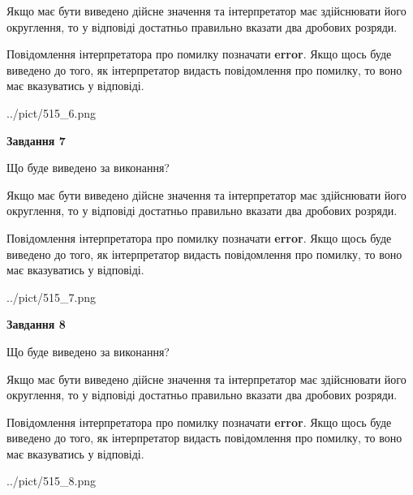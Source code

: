 \documentclass[12pt, ukrainian]{article}
\begin{document}
{\begin {Large}
Якщо має бути виведено дійсне значення та інтерпретатор має здійснювати його округлення, 
то у відповіді достатньо правильно вказати два дробових розряди.

Повідомлення інтерпретатора про помилку позначати \textbf{error}.
Якщо щось буде виведено до того, як інтерпретатор видасть повідомлення про помилку, 
то воно має вказуватись у відповіді. \par

\begin{center}
	{../pict/515_6.png}
\end{center}
\newpage

{\begin {center}\textbf{Завдання 7}\end {center}}\par
Що буде виведено за виконання? \par

Якщо має бути виведено дійсне значення та інтерпретатор має здійснювати його округлення, 
то у відповіді достатньо правильно вказати два дробових розряди.

Повідомлення інтерпретатора про помилку позначати \textbf{error}.
Якщо щось буде виведено до того, як інтерпретатор видасть повідомлення про помилку, 
то воно має вказуватись у відповіді. \par

\begin{center}
	{../pict/515_7.png}
\end{center}
\newpage

{\begin {center}\textbf{Завдання 8}\end {center}}\par
Що буде виведено за виконання? \par

Якщо має бути виведено дійсне значення та інтерпретатор має здійснювати його округлення, 
то у відповіді достатньо правильно вказати два дробових розряди.

Повідомлення інтерпретатора про помилку позначати \textbf{error}.
Якщо щось буде виведено до того, як інтерпретатор видасть повідомлення про помилку, 
то воно має вказуватись у відповіді. \par

\begin{center}
	{../pict/515_8.png}
\end{center}
\newpage


\end{Large}}
\end{document}
